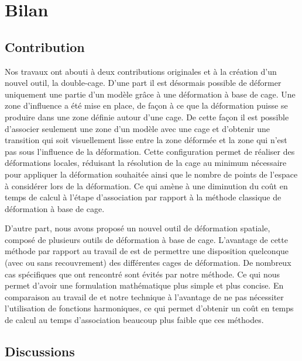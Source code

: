 
\def\baselinestretch{1}
\chapter{Bilan}
\ifpdf
\graphicspath{{Conclusions/ConclusionsFigs/PNG/}{Conclusions/ConclusionsFigs/PDF/}{Conclusions/ConclusionsFigs/}}
\else
\graphicspath{{Conclusions/ConclusionsFigs/EPS/}{Conclusions/ConclusionsFigs/}}
\fi

\section{Contribution}

Nos travaux ont abouti à deux contributions originales et à la création d'un
nouvel outil, la double-cage. D'une part il est désormais possible de déformer
uniquement une partie d'un modèle grâce à une déformation à base de cage. Une
zone d'influence a été mise en place, de façon à ce que la déformation puisse
se produire dans une zone définie autour d'une cage. De cette façon il est
possible d'associer seulement une zone d'un modèle avec une cage et d'obtenir
une transition qui soit visuellement lisse entre la zone déformée et la zone
qui n'est pas sous l'influence de la déformation. Cette configuration permet
de réaliser des déformations locales, réduisant la résolution de la cage au
minimum nécessaire pour appliquer la déformation souhaitée ainsi que le nombre
de points de l'espace à considérer lors de la déformation. Ce qui amène à une
diminution du coût en temps de calcul à l'étape d'association par rapport à la
méthode classique de déformation à base de cage.

D'autre part, nous avons proposé un nouvel outil de déformation spatiale,
composé de plusieurs outils de déformation à base de cage. L'avantage de cette
méthode par rapport au travail de \cite{GPCP13} est de permettre une
disposition quelconque (avec ou sans recouvrement) des différentes cages de
déformation. De nombreux cas spécifiques que \cite{GPCP13} ont rencontré sont
évités par notre méthode. Ce qui nous permet d'avoir une formulation
mathématique plus simple et plus concise. En comparaison au travail de
\cite{JBPS11} et \cite{GPCP13} notre technique à l'avantage de ne pas
nécessiter l'utilisation de fonctions harmoniques, ce qui permet d'obtenir un
coût en temps de calcul au temps d'association beaucoup plus faible que ces
méthodes.

\section{Discussions}

